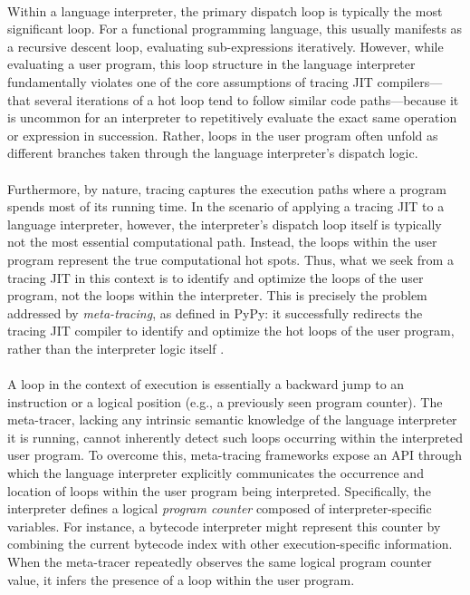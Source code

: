        \paragraph{}%
            Within a language interpreter, the primary dispatch loop is typically the most significant loop. For a functional programming language, this usually manifests as a recursive descent loop, evaluating sub-expressions iteratively. However, while evaluating a user program, this loop structure in the language interpreter fundamentally violates one of the core assumptions of tracing JIT compilers—that several iterations of a hot loop tend to follow similar code paths—because it is uncommon for an interpreter to repetitively evaluate the exact same operation or expression in succession. Rather, loops in the user program often unfold as different branches taken through the language interpreter’s dispatch logic.

        \paragraph{}%
            Furthermore, by nature, tracing captures the execution paths where a program spends most of its running time. In the scenario of applying a tracing JIT to a language interpreter, however, the interpreter's dispatch loop itself is typically not the most essential computational path. Instead, the loops within the user program represent the true computational hot spots. Thus, what we seek from a tracing JIT in this context is to identify and optimize the loops of the user program, not the loops within the interpreter. This is precisely the problem addressed by \emph{meta-tracing}, as defined in PyPy: it successfully redirects the tracing JIT compiler to identify and optimize the hot loops of the user program, rather than the interpreter logic itself \cite{pypy-main}.

        \paragraph{}%
            A loop in the context of execution is essentially a backward jump to an instruction or a logical position (e.g., a previously seen program counter). The meta-tracer, lacking any intrinsic semantic knowledge of the language interpreter it is running, cannot inherently detect such loops occurring within the interpreted user program. To overcome this, meta-tracing frameworks expose an API through which the language interpreter explicitly communicates the occurrence and location of loops within the user program being interpreted. Specifically, the interpreter defines a logical \emph{program counter} composed of interpreter-specific variables. For instance, a bytecode interpreter might represent this counter by combining the current bytecode index with other execution-specific information. When the meta-tracer repeatedly observes the same logical program counter value, it infers the presence of a loop within the user program.

